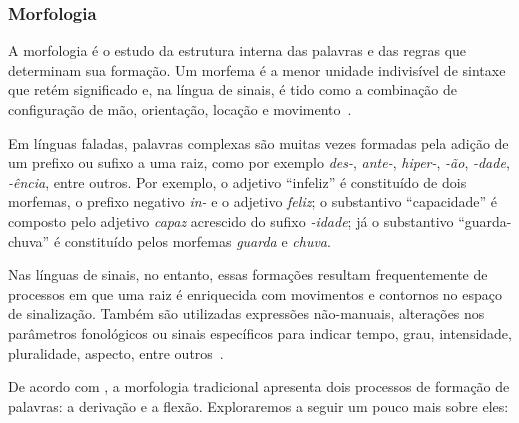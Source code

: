 \subsubsection{Morfologia}
\label{sec:linguistica-morfologia}

A morfologia é o estudo da estrutura interna das palavras e das regras que determinam sua formação. Um morfema é a menor unidade indivisível de sintaxe que retém significado e, na língua de sinais, é tido como a combinação de configuração de mão, orientação, locação e movimento~\cite{quadros-2004-estudos-linguisticos,jay-2011-dont-just-sign,hill-2019-sign-languages}.



Em línguas faladas, palavras complexas são muitas vezes formadas pela adição de um prefixo ou sufixo a uma raiz, como por exemplo \textit{des-}, \textit{ante-}, \textit{hiper-}, \textit{-ão}, \textit{-dade}, \textit{-ência}, entre outros. Por exemplo, o adjetivo ``infeliz'' é constituído de dois morfemas, o prefixo negativo \textit{in-} e o adjetivo \textit{feliz}; o substantivo ``capacidade'' é composto pelo adjetivo \textit{capaz} acrescido do sufixo \textit{-idade}; já o substantivo ``guarda-chuva'' é constituído pelos morfemas \textit{guarda} e \textit{chuva}.

Nas línguas de sinais, no entanto, essas formações resultam frequentemente de processos em que uma raiz é enriquecida com movimentos e contornos no espaço de sinalização. Também são utilizadas expressões não-manuais, alterações nos parâmetros fonológicos ou sinais específicos para indicar tempo, grau, intensidade, pluralidade, aspecto, entre outros~\cite{klima-1975-wit-poetry-asl,quadros-2004-estudos-linguisticos}.

De acordo com , a morfologia tradicional apresenta dois processos de formação de palavras: a derivação e a flexão. Exploraremos a seguir um pouco mais sobre eles:

